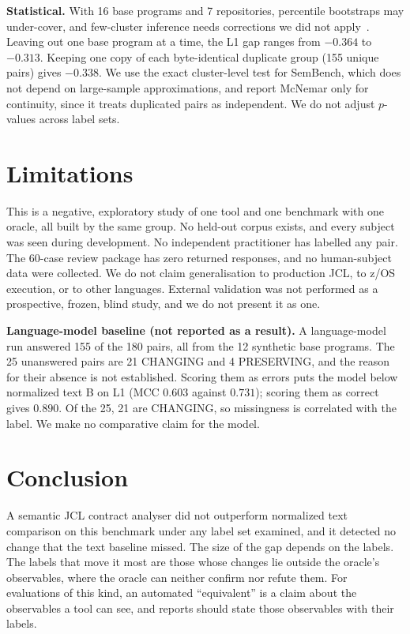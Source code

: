 \documentclass[conference]{IEEEtran}
\begin{document}
\textbf{Statistical.} With 16 base programs and 7 repositories, percentile bootstraps may under-cover, and few-cluster inference needs corrections we did not apply~\cite{cameron2008}. Leaving out one base program at a time, the L1 gap ranges from $-0.364$ to $-0.313$. Keeping one copy of each byte-identical duplicate group (155 unique pairs) gives $-0.338$. We use the exact cluster-level test for SemBench, which does not depend on large-sample approximations, and report McNemar only for continuity, since it treats duplicated pairs as independent. We do not adjust $p$-values across label sets.

\section{Limitations}
This is a negative, exploratory study of one tool and one benchmark with one oracle, all built by the same group. No held-out corpus exists, and every subject was seen during development. No independent practitioner has labelled any pair. The 60-case review package has zero returned responses, and no human-subject data were collected. We do not claim generalisation to production JCL, to z/OS execution, or to other languages. External validation was not performed as a prospective, frozen, blind study, and we do not present it as one.

\textbf{Language-model baseline (not reported as a result).} A language-model run answered 155 of the 180 pairs, all from the 12 synthetic base programs. The 25 unanswered pairs are 21 CHANGING and 4 PRESERVING, and the reason for their absence is not established. Scoring them as errors puts the model below normalized text B on L1 (MCC $0.603$ against $0.731$); scoring them as correct gives $0.890$. Of the 25, 21 are CHANGING, so missingness is correlated with the label. We make no comparative claim for the model.

\section{Conclusion}
A semantic JCL contract analyser did not outperform normalized text comparison on this benchmark under any label set examined, and it detected no change that the text baseline missed. The size of the gap depends on the labels. The labels that move it most are those whose changes lie outside the oracle's observables, where the oracle can neither confirm nor refute them. For evaluations of this kind, an automated ``equivalent'' is a claim about the observables a tool can see, and reports should state those observables with their labels.
\end{document}
